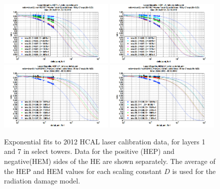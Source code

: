 \begin{figure}[hbtp]
  \begin{center}
    \includegraphics[width=0.49\textwidth]{figures/laserdatafits_HEP_layer1.png}
    \includegraphics[width=0.49\textwidth]{figures/laserdatafits_HEM_layer1.png}
    \includegraphics[width=0.49\textwidth]{figures/laserdatafits_HEP_layer7.png}
    \includegraphics[width=0.49\textwidth]{figures/laserdatafits_HEM_layer7.png}
    \caption{Exponential fits to 2012 HCAL laser calibration data, for layers 1 and 7 in select towers. Data for the positive (HEP) and negative(HEM) sides of the HE are shown separately. The average of the HEP and HEM values for each scaling constant $D$ is used for the radiation damage model.~\cite{epshteyn}}
    \label{fig:laserdatafits}
  \end{center}
\end{figure}

